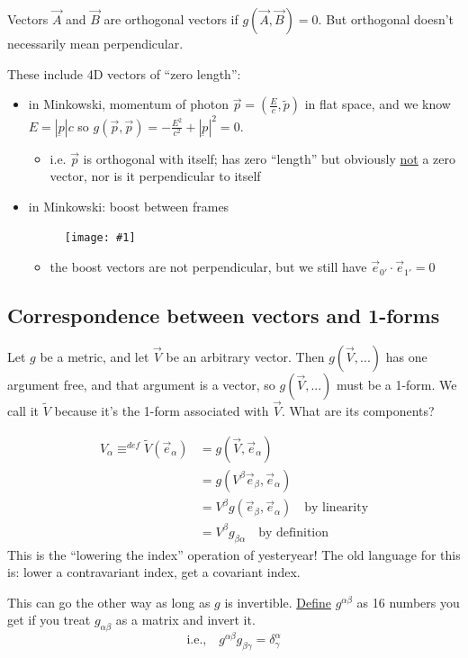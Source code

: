 \documentclass[a4paper]{article} %
\newcommand{\utilde}[1]{\tilde{#1}}
\newcommand{\picturesize}[2]
{
\begin{figure}[h]
\centering
\texttt{[image: \#1]}
\end{figure}
}
\renewcommand{\tilde}{\widetilde}
\begin{document}
Vectors $\vec{A}$ and $\vec{B}$ are orthogonal vectors if $g(\vec{A},\vec{B})=0$. But orthogonal doesn't necessarily mean perpendicular.

These include 4D vectors of ``zero length'':
\begin{itemize}
\item in Minkowski, momentum of photon $\vec{p}=\left(\frac{E}{c},\utilde{p}\right)$ in flat space,
and we know $E=|\underbar{p}|c$ so $g(\vec{p},\vec{p})=-\frac{E^2}{c^2}+|\underbar{p}|^2=0$.
\begin{itemize}
\item i.e. $\vec{p}$ is orthogonal with itself; has zero ``length'' but obviously \underline{not} a zero vector, nor is it perpendicular to itself
\end{itemize}
\item in Minkowski: boost between frames
\picturesize{images/minkowski_boost.png}{0.4}
\begin{itemize}
\item the boost vectors are not perpendicular, but we still have $\vec{e}_{0'}\cdot\vec{e}_{1'}=0$
\end{itemize}
\end{itemize}


\subsection{Correspondence between vectors and 1-forms}

Let $g$ be a metric, and let $\vec{V}$ be an arbitrary vector. Then $g(\vec{V},...)$ has one argument free, and that argument is a vector, so $g(\vec{V},...)$ must be a 1-form. We call it $\tilde{V}$ because it's the 1-form associated with $\vec{V}$. What are its components?

\begin{align*}
V_{\alpha}\equiv^{def}\tilde{V}(\vec{e}_{\alpha})&=g(\vec{V},\vec{e}_{\alpha})\\
&=g(V^{\beta}\vec{e}_{\beta},\vec{e}_{\alpha})\\
&=V^{\beta}g(\vec{e}_{\beta},\vec{e}_{\alpha})\quad\text{by linearity}\\
&=V^{\beta}g_{\beta\alpha}\quad\text{by definition}
\end{align*}
This is the ``lowering the index'' operation of yesteryear! The old language for this is: lower a contravariant index, get a covariant index.

This can go the other way as long as $g$ is invertible. \underline{Define} $g^{\alpha\beta}$ as 16 numbers you get if you treat $g_{\alpha\beta}$ as a matrix and invert it.
\begin{equation}
\text{i.e.,}\quad g^{\alpha\beta}g_{\beta\gamma}=\delta^{\alpha}_{\gamma}
\end{equation}
\end{document}
